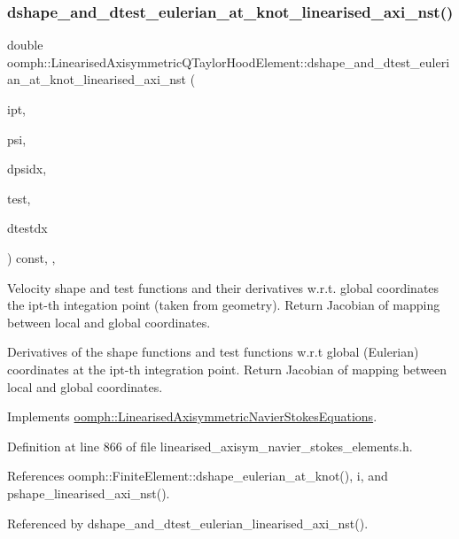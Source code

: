 \subsubsection{\texorpdfstring{dshape\+\_\+and\+\_\+dtest\+\_\+eulerian\+\_\+at\+\_\+knot\+\_\+linearised\+\_\+axi\+\_\+nst()}{dshape\_and\_dtest\_eulerian\_at\_knot\_linearised\_axi\_nst()}}
{\footnotesize\ttfamily double oomph\+::\+Linearised\+Axisymmetric\+Q\+Taylor\+Hood\+Element\+::dshape\+\_\+and\+\_\+dtest\+\_\+eulerian\+\_\+at\+\_\+knot\+\_\+linearised\+\_\+axi\+\_\+nst (\begin{DoxyParamCaption}\item[{const unsigned \&}]{ipt,  }\item[{\hyperlink{classoomph_1_1Shape}{Shape} \&}]{psi,  }\item[{\hyperlink{classoomph_1_1DShape}{D\+Shape} \&}]{dpsidx,  }\item[{\hyperlink{classoomph_1_1Shape}{Shape} \&}]{test,  }\item[{\hyperlink{classoomph_1_1DShape}{D\+Shape} \&}]{dtestdx }\end{DoxyParamCaption}) const\hspace{0.3cm}{\ttfamily [inline]}, {\ttfamily [protected]}, {\ttfamily [virtual]}}



Velocity shape and test functions and their derivatives w.\+r.\+t. global coordinates the ipt-\/th integation point (taken from geometry). Return Jacobian of mapping between local and global coordinates. 

Derivatives of the shape functions and test functions w.\+r.\+t global (Eulerian) coordinates at the ipt-\/th integration point. Return Jacobian of mapping between local and global coordinates. 

Implements \hyperlink{classoomph_1_1LinearisedAxisymmetricNavierStokesEquations_aa42c291276849d54300289506e8c365b}{oomph\+::\+Linearised\+Axisymmetric\+Navier\+Stokes\+Equations}.



Definition at line 866 of file linearised\+\_\+axisym\+\_\+navier\+\_\+stokes\+\_\+elements.\+h.



References oomph\+::\+Finite\+Element\+::dshape\+\_\+eulerian\+\_\+at\+\_\+knot(), i, and pshape\+\_\+linearised\+\_\+axi\+\_\+nst().



Referenced by dshape\+\_\+and\+\_\+dtest\+\_\+eulerian\+\_\+linearised\+\_\+axi\+\_\+nst().

